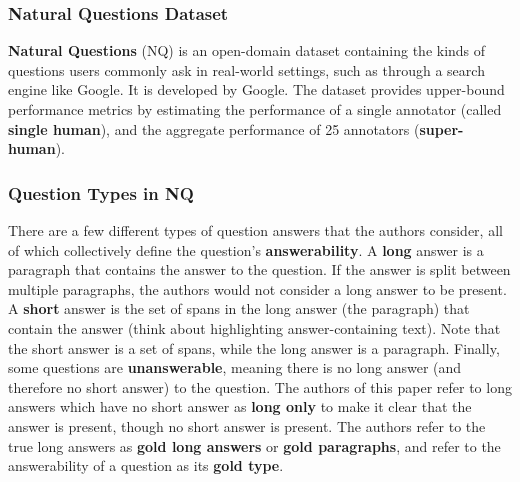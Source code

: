 \documentclass[letterpaper, 11pt]{article}
\begin{document}
\subsubsection{Natural Questions Dataset}
\label{sec:natural-questions-dataset}
\textbf{Natural Questions} (NQ) is an open-domain dataset containing the kinds of questions users commonly ask in real-world settings, such as through a search engine like Google. It is developed by Google.
The dataset provides upper-bound performance metrics by estimating the performance of a single annotator (called \textbf{single human}), and the aggregate performance of 25 annotators (\textbf{super-human}).

\subsubsection{Question Types in NQ}
There are a few different types of question answers that the authors consider, all of which collectively define the question's \textbf{answerability}. A \textbf{long} answer is a paragraph that contains the answer to the question. If the answer is split between multiple paragraphs, the authors would not consider a long answer to be present. A \textbf{short} answer 
is the set of spans in the long answer (the paragraph) that contain the answer (think about highlighting answer-containing text). Note that the short answer is a set of spans, while the long answer is a paragraph. 
Finally, some questions are \textbf{unanswerable}, meaning there is no long answer (and therefore no short answer) to the question. The authors of this paper refer to long answers which have no short answer as \textbf{long only} to make it clear that the answer is present, though no short answer is present.
The authors refer to the true long answers as \textbf{gold long answers} or \textbf{gold paragraphs}, and refer to the answerability of a question as its \textbf{gold type}.
\end{document}
